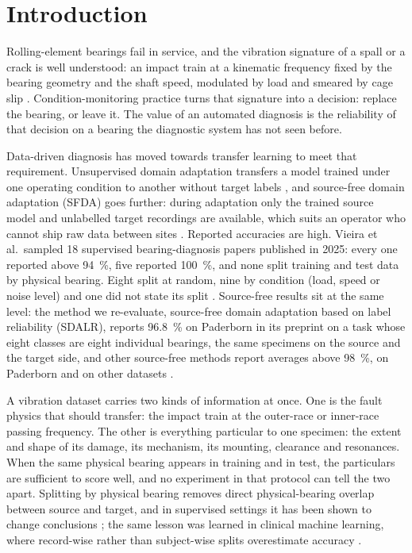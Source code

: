 \section{Introduction}
\label{sec:intro}

Rolling-element bearings fail in service, and the vibration signature of a spall or a crack is well understood: an impact
train at a kinematic frequency fixed by the bearing geometry and the shaft speed, modulated by load and smeared by cage slip
\cite{randall2011}. Condition-monitoring practice turns that signature into a decision: replace the bearing, or leave it.
The value of an automated diagnosis is the reliability of that decision on a bearing the diagnostic system has not seen
before.

Data-driven diagnosis has moved towards transfer learning to meet that requirement. Unsupervised domain adaptation
transfers a model trained under one operating condition to another without target labels \cite{zhao2021udtl}, and source-free
domain adaptation (SFDA) goes further: during adaptation only the trained source model and unlabelled target recordings are
available, which suits an operator who cannot ship raw data between sites \cite{liang2020shot,sdalr2025}. Reported
accuracies are high. Vieira et al.\ sampled 18 supervised bearing-diagnosis papers published in 2025: every one reported
above \SI{94}{\percent}, five reported \SI{100}{\percent}, and none split training and test data by physical bearing.
Eight split at random, nine by condition (load, speed or noise level) and one did not state its split
\cite[Table~1]{vieira2026}. Source-free results sit at the same level: the method we re-evaluate, source-free domain
adaptation based on label reliability (SDALR), reports
\SI{96.8}{\percent} on Paderborn in its preprint \cite{sdalr2025} on a task whose eight classes are eight individual bearings, the same
specimens on the source and the target side, and other source-free methods report averages above \SI{98}{\percent}, on Paderborn
\cite{yan2026hybrid} and on other datasets \cite{li2025csad}.

A vibration dataset carries two kinds of information at once. One is the fault physics that should transfer: the impact
train at the outer-race or inner-race passing frequency. The other is everything particular to one specimen: the extent
and shape of its damage, its mechanism, its mounting, clearance and resonances. When the same physical bearing appears in
training and in test, the particulars are sufficient to score well, and no experiment in that protocol can tell the two
apart. Splitting by physical bearing removes direct physical-bearing overlap between source and target, and in supervised settings it has been shown to change
conclusions \cite{hendriks2022,wheat2024leakage,vieira2026,kaya2026}; the same lesson was learned in clinical machine
learning, where record-wise rather than subject-wise splits overestimate accuracy \cite{saeb2017}.

